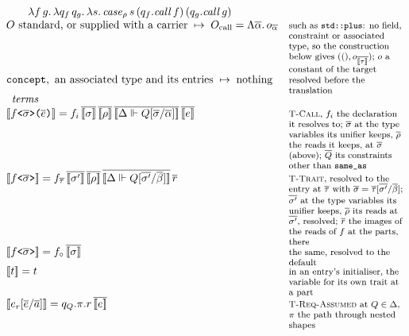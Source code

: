 \begin{figure}[htbp]
\[\begin{array}{@{}l@{\quad}l@{}}
\qquad \lambda f\,g.\,\lambda q_f\,q_g.\,\lambda s.\,\mathit{case}_{\rho}\,s\,(q_f.\mathit{call}\,f)\,(q_g.\mathit{call}\,g) & \\
O \text{ standard, or supplied with a carrier} \;\mapsto\; O_{\mathrm{call}} = \Lambda\overline{\alpha}.\,o_{\overline{\alpha}} & \note{such as \texttt{std::plus}: no field, constraint or associated type, so the construction below gives $((), o_{\overline{\llbracket \tau \rrbracket}})$; $o$ a constant of the target} \\
\texttt{concept}, \text{ an associated type and its entries} \;\mapsto\; \text{nothing} & \note{resolved before the translation} \\[6pt]
\multicolumn{2}{l}{\textit{terms}} \\
\llbracket f\texttt{<}\overline{\sigma}\texttt{>(}\overline{e}\texttt{)} \rrbracket = f_i\,\overline{\llbracket \sigma \rrbracket}\,\overline{\llbracket \rho \rrbracket}\,\overline{\llbracket \Delta \Vdash Q[\overline{\sigma}/\overline{\alpha}] \rrbracket}\,\overline{\llbracket e \rrbracket} & \note{\textsc{T-Call}, $f_i$ the declaration it resolves to; $\overline{\sigma}$ at the type variables its unifier keeps, $\overline{\rho}$ the reads it keeps, at $\overline{\sigma}$ (above); $\overline{Q}$ its constraints other than \texttt{same\_as}} \\
\llbracket f\texttt{<}\overline{\sigma}\texttt{>} \rrbracket = f_{\overline{\tau}}\,\overline{\llbracket \sigma' \rrbracket}\,\overline{\llbracket \rho \rrbracket}\,\overline{\llbracket \Delta \Vdash Q[\overline{\sigma'}/\overline{\beta}] \rrbracket}\,\overline{r} & \note{\textsc{T-Trait}, resolved to the entry at $\overline{\tau}$ with $\overline{\sigma} = \overline{\tau}[\overline{\sigma'}/\overline{\beta}]$; $\overline{\sigma'}$ at the type variables its unifier keeps, $\overline{\rho}$ its reads at $\overline{\sigma'}$, resolved; $\overline{r}$ the images of the reads of $f$ at the parts, there} \\
\llbracket f\texttt{<}\overline{\sigma}\texttt{>} \rrbracket = f_{\circ}\,\overline{\llbracket \sigma \rrbracket} & \note{the same, resolved to the default} \\
\llbracket t \rrbracket = t & \note{in an entry's initialiser, the variable for its own trait at a part} \\
\llbracket e_r[\overline{e}/\overline{a}] \rrbracket = q_Q.\pi.r\,\overline{\llbracket e \rrbracket} & \note{\textsc{T-Req-Assumed} at $Q \in \Delta$, $\pi$ the path through nested shapes} \\

\end{array}\]
\end{figure}
